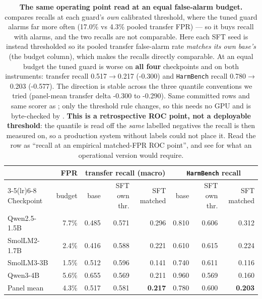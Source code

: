 \begin{table}[htbp]\centering\small\setlength{\tabcolsep}{4.5pt}
\caption{\textbf{The same operating point read at an equal false-alarm budget.}  compares recalls at each guard's \emph{own} calibrated threshold, where the tuned guard alarms far more often (17.0\% vs 4.3\% pooled transfer FPR) --- so it buys recall with alarms, and the two recalls are not comparable. Here each SFT seed is instead thresholded so its pooled transfer false-alarm rate \emph{matches its own base's} (the budget column), which makes the recalls directly comparable. At an equal budget the tuned guard is worse on \textbf{all four} checkpoints and on both instruments: transfer recall 0.517$\rightarrow$0.217 (-0.300) and \texttt{HarmBench} recall 0.780$\rightarrow$0.203 (-0.577). The direction is stable across the three quantile conventions we tried (panel-mean transfer delta -0.300 to -0.290). Same committed rows and same scorer as ; only the threshold rule changes, so this needs no GPU and is byte-checked by . \textbf{This is a retrospective ROC point, not a deployable threshold}: the quantile is read off the \emph{same} labelled negatives the recall is then measured on, so a production system without labels could not place it. Read the row as ``recall at an empirical matched-FPR ROC point'', and see  for what an operational version would require.}
\label{tab:matchedfpr}
\begin{tabular}{lrrrrrrr}\toprule
& FPR & \multicolumn{3}{c}{transfer recall (macro)} & \multicolumn{3}{c}{\texttt{HarmBench} recall} \\
\cmidrule(lr){3-5}\cmidrule(lr){6-8}
Checkpoint & budget & base & SFT own thr. & SFT matched & base & SFT own thr. & SFT matched \\
\midrule
Qwen2.5-1.5B & 7.7\% & 0.485 & 0.571 & 0.296 & 0.810 & 0.606 & 0.312 \\
SmolLM2-1.7B & 2.4\% & 0.416 & 0.588 & 0.221 & 0.610 & 0.615 & 0.224 \\
SmolLM3-3B & 1.5\% & 0.512 & 0.596 & 0.141 & 0.740 & 0.611 & 0.116 \\
Qwen3-4B & 5.6\% & 0.655 & 0.569 & 0.211 & 0.960 & 0.569 & 0.160 \\
\midrule
Panel mean & 4.3\% & 0.517 & 0.581 & \textbf{0.217} & 0.780 & 0.600 & \textbf{0.203} \\
\bottomrule
\end{tabular}
\end{table}
